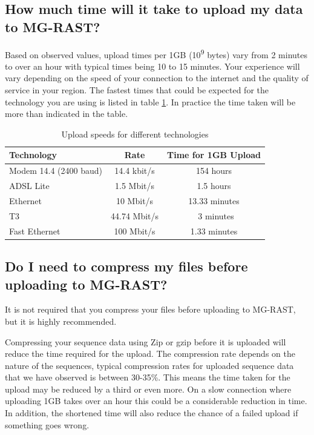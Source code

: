 \documentclass[12pt,fullpage]{report}
\begin{document}
\subsection{How much time will it take to upload my data to MG-RAST?}
Based on observed values, upload times per 1GB (10\textsuperscript{9} bytes) vary from 2 minutes to over an hour with typical times being 10 to 15 minutes. Your experience will vary depending on the speed of your connection to the internet and the quality of service in your region.
The fastest times that could be expected for the technology you are using is listed in table \ref{table:upload_speeds}. In practice the time taken will be more than indicated in the table.

\begin{table}
\caption{Upload speeds for different technologies}
\centering
\renewcommand{\arraystretch}{1.5}
\renewcommand\tabcolsep{20pt}
\begin{tabular}{ l c c }
  \hline
  \hline
  \textbf{Technology} & \textbf{Rate} & \textbf{Time for 1GB Upload} \\
  \hline
  Modem 14.4 (2400 baud) & 14.4 kbit/s & 154 hours \\
  ADSL Lite & 1.5 Mbit/s & 1.5 hours \\
  Ethernet & 10 Mbit/s & 13.33 minutes \\
  T3 & 44.74 Mbit/s & ~3 minutes \\
  Fast Ethernet & 100 Mbit/s & 1.33 minutes \\
  \hline
  \hline
\end{tabular}
\label{table:upload_speeds}
\end{table}

\subsection{Do I need to compress my files before uploading to MG-RAST?}
It is not required that you compress your files before uploading to MG-RAST, but it is highly recommended.

Compressing your sequence data using Zip or gzip before it is uploaded will reduce the time required for the upload. The compression rate depends on the nature of the sequences, typical compression rates for uploaded sequence data that we have observed is between 30-35\%. This means the time taken for the upload may be reduced by a third or even more. On a slow connection where uploading 1GB takes over an hour this could be a considerable reduction in time. In addition, the shortened time will also reduce the chance of a failed upload if something goes wrong.
\end{document}

